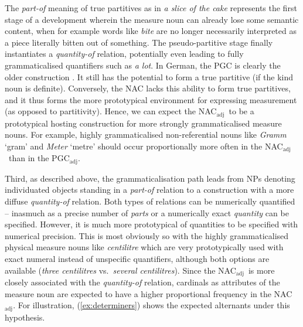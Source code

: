 \documentclass[USenglish]{article}
\newcommand{\Sub}[1]{\ensuremath{\mathrm{_{#1}}}}
\newcommand{\NACa}{NAC\Sub{adj}}
\newcommand{\PGCa}{PGC\Sub{adj}}
\begin{document}
The \textit{part-of} meaning of true partitives as in \textit{a slice of the cake} represents the first stage of a development wherein the measure noun can already lose some semantic content, when for example words like \textit{bite} are no longer necessarily interpreted as a piece literally bitten out of something.
The pseudo-partitive stage finally instantiates a \textit{quantity-of} relation, potentially even leading to fully grammaticalised quantifiers such as \textit{a lot}.
In German, the PGC is clearly the older construction \citep{Zimmer2015}.
It still has the potential to form a true partitive (if the kind noun is definite).
Conversely, the NAC lacks this ability to form true partitives, and it thus forms the more prototypical environment for expressing measurement (as opposed to partitivity).
Hence, we can expect the \NACa\ to be a prototypical hosting construction for more strongly grammaticalised measure nouns.
For example, highly grammaticalised non-referential nouns like \textit{Gramm} `gram' and \textit{Meter} `metre' should occur proportionally more often in the \NACa\ than in the \PGCa.


Third, as described above, the grammaticalisation path leads from NPs denoting individuated objects standing in a \textit{part-of} relation to a construction with a more diffuse \textit{quantity-of} relation.
Both types of relations can be numerically quantified -- inasmuch as a precise number of \textit{parts} or a numerically exact \textit{quantity} can be specified.
However, it is much more prototypical of quantities to be specified with numerical precision.
This is most obviously so with the highly grammaticalised physical measure nouns like \textit{centilitre} which are very prototypically used with exact numeral instead of unspecific quantifiers, although both options are available (\textit{three centilitres} vs.\ \textit{several centilitres}).
Since the \NACa\ is more closely associated with the \textit{quantity-of} relation, cardinals as attributes of the measure noun are expected to have a higher proportional frequency in the \NACa.
For illustration, (\ref{ex:determiners}) shows the expected alternants under this hypothesis.
\end{document}
